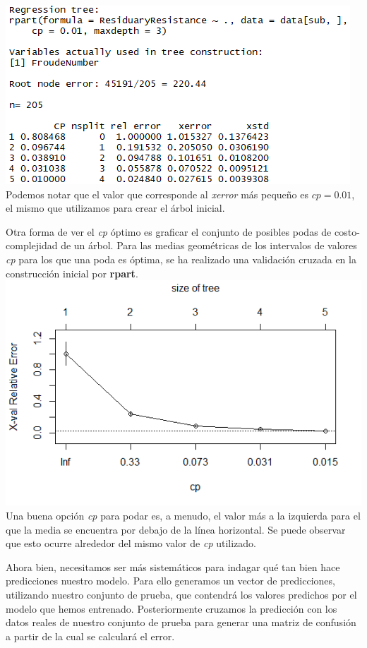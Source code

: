 \documentclass[twoside]{article}
\begin{document}
\begin{multicols}{2}
\includegraphics[scale=0.5]{images/pic_38.png}\\

Podemos notar que el valor que corresponde al \textit{xerror} m\'as peque\~no es $cp = 0.01$, el mismo que utilizamos para crear el \'arbol inicial. 

Otra forma de ver el \textit{cp} \'optimo es graficar el conjunto de posibles podas de costo-complejidad de un \'arbol. Para las medias geom\'etricas de los intervalos de valores \textit{cp} para los que una poda es \'optima, se ha realizado una validaci\'on cruzada en la construcci\'on inicial por \textbf{rpart}.\\

\includegraphics[scale=0.5]{images/pic_39.png}\\

Una buena opci\'on \textit{cp} para podar es, a menudo, el valor m\'as a la izquierda para el que la media se encuentra por debajo de la l\'inea horizontal. Se puede observar que esto ocurre alrededor del mismo valor de \textit{cp} utilizado.

Ahora bien, necesitamos ser m\'as sistem\'aticos para indagar qu\'e tan bien hace predicciones nuestro modelo. Para ello generamos un vector de predicciones, utilizando nuestro conjunto de prueba, que contendr\'a los valores predichos por el modelo que hemos entrenado. Posteriormente cruzamos la predicci\'on con los datos reales de nuestro conjunto de prueba para generar una matriz de confusi\'on a partir de la cual se calcular\'a el error.\\


\end{multicols}
\end{document}
